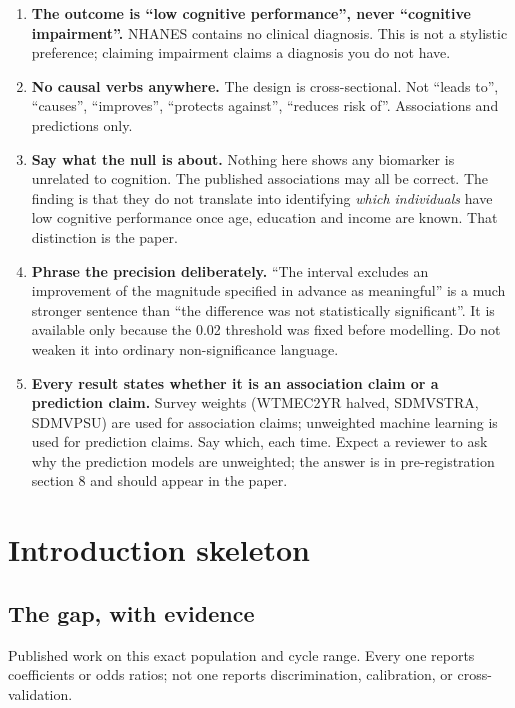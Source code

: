 \documentclass[11pt]{article}
\newcommand{\num}[1]{{\ttfamily #1}}
\begin{document}
\begin{enumerate}[leftmargin=1.4em,itemsep=5pt,topsep=4pt]
\item \textbf{The outcome is ``low cognitive performance'', never ``cognitive impairment''.} NHANES contains no clinical diagnosis. This is not a stylistic preference; claiming impairment claims a diagnosis you do not have.
\item \textbf{No causal verbs anywhere.} The design is cross-sectional. Not ``leads to'', ``causes'', ``improves'', ``protects against'', ``reduces risk of''. Associations and predictions only.
\item \textbf{Say what the null is about.} Nothing here shows any biomarker is unrelated to cognition. The published associations may all be correct. The finding is that they do not translate into identifying \emph{which individuals} have low cognitive performance once age, education and income are known. That distinction is the paper.
\item \textbf{Phrase the precision deliberately.} ``The interval excludes an improvement of the magnitude specified in advance as meaningful'' is a much stronger sentence than ``the difference was not statistically significant''. It is available only because the 0.02 threshold was fixed before modelling. Do not weaken it into ordinary non-significance language.
\item \textbf{Every result states whether it is an association claim or a prediction claim.} Survey weights (\num{WTMEC2YR} halved, \num{SDMVSTRA}, \num{SDMVPSU}) are used for association claims; unweighted machine learning is used for prediction claims. Say which, each time. Expect a reviewer to ask why the prediction models are unweighted; the answer is in pre-registration section 8 and should appear in the paper.
\end{enumerate}

\section{Introduction skeleton}

\subsection*{The gap, with evidence}

Published work on this exact population and cycle range. Every one reports coefficients or odds ratios; not one reports discrimination, calibration, or cross-validation.
\end{document}
